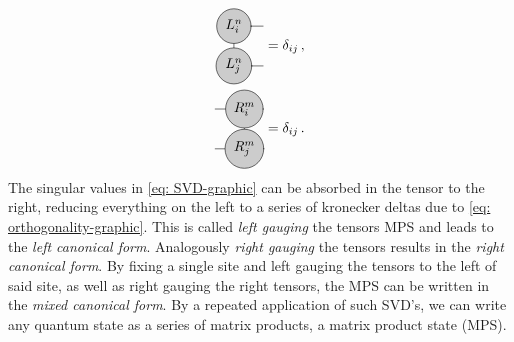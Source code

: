 \documentclass[twoside,twocolumn,9pt]{article}
\begin{document}
\begin{align} \label{eq: orthogonality-graphic}
  \begin{split}
    \begin{tikzpicture}[baseline={([yshift=-.5ex]current bounding box.center)}]
      \draw[gray, thick] (0,0) -- (0,-1);
      \draw[gray, thick] (0,0) -- (0.75,0);
      \draw[gray, thick] (0,-1) -- (0.75,-1);
      \node[draw, circle, line cap=round, fill=black!20, minimum size=12] at (0,0) {$L_i^n$};
      \node[draw, circle, line cap=round, fill=black!20, minimum size=12] at (0,-1) {$L_j^n$};
    \end{tikzpicture} &= \delta_{ij} \thinspace ,\\
    \begin{tikzpicture}[baseline={([yshift=-.5ex]current bounding box.center)}]
      \draw[gray, thick] (0,0) -- (0,-1);
      \draw[gray, thick] (0,0) -- (-0.75,0);
      \draw[gray, thick] (0,-1) -- (-0.75,-1);
      \node[draw, circle, line cap=round, fill=black!20, minimum size=12] at (0,0) {$R_i^m$};
      \node[draw, circle, line cap=round, fill=black!20, minimum size=12] at (0,-1) {$R_j^m$};
    \end{tikzpicture} &= \delta_{ij} \thinspace .
  \end{split}
\end{align}
The singular values in \cref{eq: SVD-graphic} can be absorbed in the tensor to the right, reducing everything on the left to a series of kronecker deltas due to \cref{eq: orthogonality-graphic}. This is called \emph{left gauging} the tensors MPS and leads to the \emph{left canonical form}. Analogously \emph{right gauging} the tensors results in the \emph{right canonical form}. By fixing a single site and left gauging the tensors to the left of said site, as well as right gauging the right tensors, the MPS can be written in the \emph{mixed canonical form}. By a repeated application of such SVD's, we can write any quantum state as a series of matrix products, a matrix product state (MPS).
\end{document}
